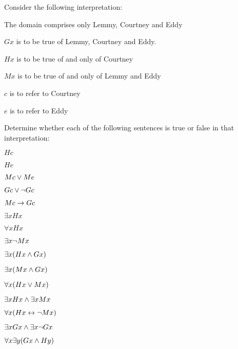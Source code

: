 \problempart
\label{pr.TorF2}
Consider the following interpretation:	
	\begin{ebullet}
		\item The domain comprises only Lemmy, Courtney and Eddy
		\item $Gx$ is to be true of Lemmy, Courtney and Eddy.
		\item $Hx$ is to be true of and only of Courtney
		\item $Mx$ is to be true of and only of Lemmy and Eddy
		\item $c$ is to refer to Courtney
		\item $e$ is to refer to Eddy
	\end{ebullet}
Determine whether each of the following sentences is true or false in that interpretation:
\begin{earg}
\item $Hc$
\item $He$
\item $Mc \vee Me$
\item $Gc \vee \neg Gc$
\item $Mc \rightarrow Gc$
\item $\exists x Hx$
\item $\forall x Hx$
\item $\exists x \neg Mx$
\item $\exists x(Hx \wedge Gx)$
\item $\exists x(Mx \wedge Gx)$
\item $\forall x(Hx \vee Mx)$
\item $\exists x Hx \wedge \exists x Mx$
\item $\forall x(Hx \leftrightarrow \neg Mx)$
\item $\exists x Gx \wedge \exists x \neg Gx$
\item $\forall x\exists y(Gx \wedge Hy)$
\end{earg}

